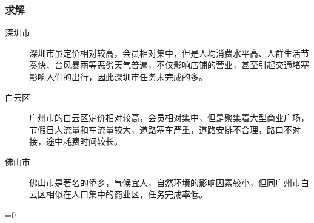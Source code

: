 \documentclass{article}
\begin{document}
\subsubsection{求解}
\begin{description}
	\item[深圳市]深圳市虽定价相对较高，会员相对集中，但是人均消费水平高、人群生活节奏快、台风暴雨等恶劣天气普遍，不仅影响店铺的营业，甚至引起交通堵塞影响人们的出行，因此深圳市任务未完成的多。 
	\item[白云区]广州市的白云区定价相对较高，会员相对集中，但是聚集着大型商业广场，节假日人流量和车流量较大，道路塞车严重，道路安排不合理，路口不对接，途中耗费时间较长。
	\item[佛山市]佛山市是著名的侨乡，气候宜人，自然环境的影响因素较小，但同广州市白云区相似在人口集中的商业区，任务完成率低。
\end{description}
\ifnum{}=0
	
\end{document}
